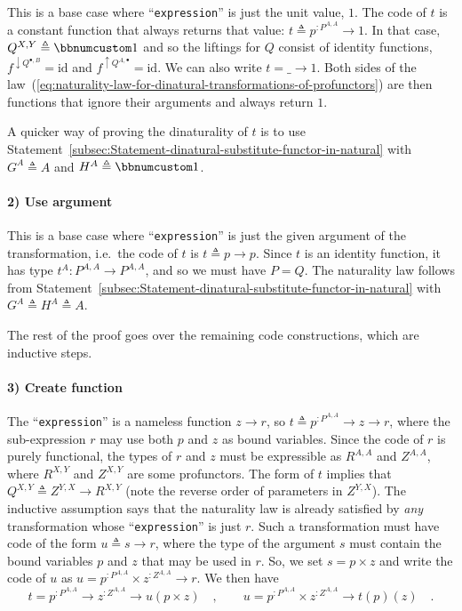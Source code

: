 This is a base case where ``\lstinline!expression!'' is just the
unit value, $1$. The code of $t$ is a constant function that always
returns that value: $t\triangleq p^{:P^{A,A}}\rightarrow1$. In that
case, $Q^{X,Y}\triangleq\bbnum 1$ and so the liftings for $Q$ consist
of identity functions, $f^{\downarrow Q^{\bullet,B}}=\text{id}$ and
$f^{\uparrow Q^{A,\bullet}}=\text{id}$. We can also write $t=\_\rightarrow1$.
Both sides of the law~(\ref{eq:naturality-law-for-dinatural-transformations-of-profunctors})
are then functions that ignore their arguments and always return $1$.

A quicker way of proving the dinaturality of $t$ is to use Statement~\ref{subsec:Statement-dinatural-substitute-functor-in-natural}
with $G^{A}\triangleq A$ and $H^{A}\triangleq\bbnum 1$.

\paragraph{2) Use argument }

This is a base case where ``\lstinline!expression!'' is just the
given argument of the transformation, i.e.~the code of $t$ is $t\triangleq p\rightarrow p$.
Since $t$ is an identity function, it has type $t^{A}:P^{A,A}\rightarrow P^{A,A}$,
and so we must have $P=Q$. The naturality law follows from Statement~\ref{subsec:Statement-dinatural-substitute-functor-in-natural}
with $G^{A}\triangleq H^{A}\triangleq A$.

The rest of the proof goes over the remaining code constructions,
which are inductive steps.

\paragraph{3) Create function}

The ``\lstinline!expression!'' is a nameless function $z\rightarrow r$,
so $t\triangleq p^{:P^{A,A}}\rightarrow z\rightarrow r$, where the
sub-expression $r$ may use both $p$ and $z$ as bound variables.
Since the code of $r$ is purely functional, the types of $r$ and
$z$ must be expressible as $R^{A,A}$ and $Z^{A,A}$, where $R^{X,Y}$
and $Z^{X,Y}$ are some profunctors. The form of $t$ implies that
$Q^{X,Y}\triangleq Z^{Y,X}\rightarrow R^{X,Y}$ (note the reverse
order of parameters in $Z^{Y,X}$). The inductive assumption says
that the naturality law is already satisfied by \emph{any} transformation
whose ``\lstinline!expression!'' is just $r$. Such a transformation
must have code of the form $u\triangleq s\rightarrow r$, where the
type of the argument $s$ must contain the bound variables $p$ and
$z$ that may be used in $r$. So, we set $s=p\times z$ and write
the code of $u$ as $u=p^{:P^{A,A}}\times z^{:Z^{A,A}}\rightarrow r$.
We then have
\begin{equation}
t=p^{:P^{A,A}}\rightarrow z^{:Z^{A,A}}\rightarrow u(p\times z)\quad,\quad\quad u=p^{:P^{A,A}}\times z^{:Z^{A,A}}\rightarrow t(p)(z)\quad.\label{eq:dinaturality-u-function-type-derivation0}
\end{equation}

